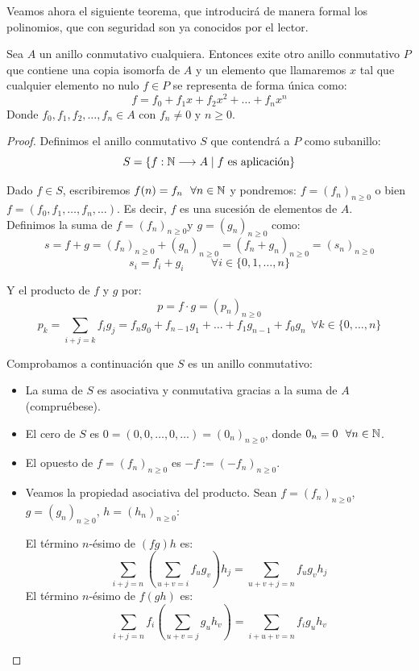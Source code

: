 Veamos ahora el siguiente teorema, que introducirá de manera formal los polinomios, que con seguridad son ya conocidos por el lector.
\begin{teo}
    Sea $A$ un anillo conmutativo cualquiera. Entonces exite otro anillo conmutativo $P$ que contiene una copia isomorfa de $A$
    y un elemento que llamaremos $x$ tal que cualquier elemento no nulo $f \in P$ se representa de forma única como:
    $$f = f_0 + f_1x + f_2 x^2 + \ldots + f_n x^n$$
    Donde $f_0, f_1, f_2, \ldots, f_n \in A$ con $f_n \neq 0$ y $n \geq 0$.
\end{teo}
\begin{proof}
    Definimos el anillo conmutativo $S$ que contendrá a $P$ como subanillo:
    $$S = \{f:\mathbb N \longrightarrow A \mid f \mbox{ es aplicación}\}$$
    
    Dado $f\in S$, escribiremos $f(n) = f_n~~\forall n \in \mathbb N$ y pondremos: $f=(f_n)_{n\geq 0}$ o bien $f = (f_0, f_1, \ldots, f_n, \ldots)$. Es decir, $f$ es una sucesión de elementos de $A$.\\
    
    Definimos la suma de $f=(f_n)_{n\geq0} $y $g=(g_n)_{n\geq 0}$ como:
    $$s = f+g = (f_n)_{n\geq0} + (g_n)_{n\geq0} = (f_n+g_n)_{n\geq0} = (s_n)_{n\geq0}$$
    $$s_i = f_i + g_i \hspace{1cm} \forall i \in \{0, 1, \ldots, n\}$$
    
    Y el producto de $f$ y $g$ por:
    $$p = f\cdot g = (p_n)_{n\geq0}$$
    $$p_k = \sum_{i+j=k} f_i g_j = f_n g_0 + f_{n-1}g_1 + \ldots + f_1 g_{n-1} + f_0 g_n~~\forall k \in \{0, \ldots, n\}$$

    
    Comprobamos a continuación que $S$ es un anillo conmutativo:
    \begin{itemize}
        \item La suma de $S$ es asociativa y conmutativa gracias a la suma de $A$ (compruébese).

        \item El cero de $S$ es $0 = (0, 0, \ldots, 0, \ldots) = (0_n)_{n\geq0}$, donde $0_n = 0~~\forall n \in\mathbb N$.

        \item El opuesto de $f=(f_n)_{n\geq0}$ es $-f:=(-f_n)_{n\geq0}$.

        \item Veamos la propiedad asociativa del producto. Sean $f=(f_n)_{n\geq0}$, $g=(g_n)_{n\geq0}$, $h=(h_n)_{n\geq0}$:
        
        El término $n$-ésimo de $(fg)h$ es:
        $$\sum\limits_{i+j=n} \left( \sum_{u+v=i} f_u g_v \right) h_j = \sum_{u+v+j=n} f_u g_v h_j$$
        El término $n$-ésimo de $f(gh)$ es:
        $$\sum\limits_{i+j=n} f_i \left( \sum_{u+v=j} g_u h_v \right) = \sum_{i+u+v=n} f_i g_u h_v$$


\end{itemize}
\end{proof}
